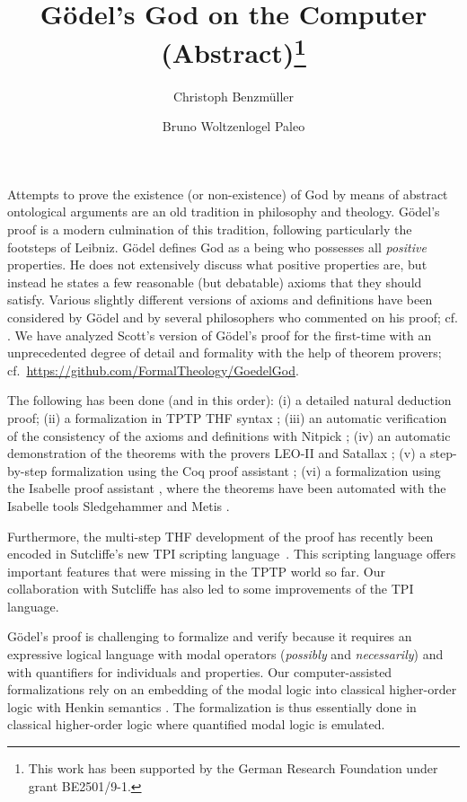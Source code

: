 \documentclass{easychair}
\title{G\"{o}del's God on the Computer (Abstract)\thanks{This work has been
    supported by the German Research Foundation under grant
    BE2501/9-1.}}
\author{
  Christoph Benzm\"{u}ller\inst{1} 
  \and 
  Bruno Woltzenlogel Paleo\inst{2}
}
\institute{
 Freie Universit\"{a}t Berlin, Germany \\
 \email{c.benzmueller@fu-berlin.de} \\
  \and 
 Vienna University of Technology, Austria \\
  \email{bruno@logic.at} \\
}
\begin{document}
\maketitle

Attempts to prove the existence (or non-existence) of God by means of
abstract ontological arguments are an old tradition in philosophy and
theology.  G\"{o}del's proof \cite{Goedel1970,GoedelNotes} is a modern culmination of
this tradition, following particularly the footsteps of Leibniz.
%
G\"{o}del defines God as a being who possesses all \emph{positive} properties.
He does not extensively discuss what positive properties are, 
but instead he states a few reasonable (but debatable) axioms that they should satisfy.
Various slightly different versions of axioms and definitions have
been considered by G\"{o}del and by several philosophers who commented
on his proof; cf. \cite{sobel2004logic,AndersonGettings,Fitting,Adams,ContemporaryBibliography}.
We have analyzed Scott's version of G\"{o}del's proof \cite{ScottNotes} for the first-time
with an unprecedented degree of detail 
and formality with the help of theorem provers; cf.~\url{https://github.com/FormalTheology/GoedelGod}.

The following has been done (and in this order):
(i) a detailed natural deduction proof;
%
(ii) a formalization in TPTP THF syntax \cite{THF};
%
(iii) an automatic verification of the consistency of the axioms and 
definitions with Nitpick \cite{Nitpick};
%
(iv) an automatic demonstration of the theorems with the provers LEO-II \cite{LEO} and Satallax \cite{Satallax};
%
(v) a step-by-step formalization using the Coq proof assistant \cite{Coq};
%
(vi) a formalization using the Isabelle proof assistant \cite{Isabelle}, where the
theorems have been automated with the Isabelle tools Sledgehammer \cite{Sledgehammer} and Metis \cite{Metis}.

Furthermore, the multi-step THF development of the proof has
recently been encoded in Sutcliffe's new TPI scripting
language~\cite{TPI}. This scripting language offers important features
that were missing in the TPTP world so far. Our collaboration with
Sutcliffe has also led to some improvements of the TPI language.

G\"{o}del's proof is challenging to formalize and verify because it
requires an expressive logical language with modal operators
(\emph{possibly} and \emph{necessarily}) and with
quantifiers for individuals and properties.  Our computer-assisted formalizations rely on an
embedding of the modal logic into classical higher-order logic with
Henkin semantics  \cite{J23,B9}. The formalization is thus essentially
done in classical higher-order logic where  quantified modal logic is
emulated.
\end{document}
